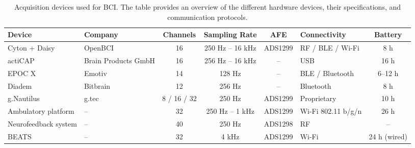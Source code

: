 \begin{table}[htbp]
    \renewcommand{\arraystretch}{1.2}
    \renewcommand{\tabularxcolumn}[1]{m{#1}}
    \caption{Acquisition devices used for BCI. The table provides an overview of the different hardware devices, their specifications, and communication protocols.}
    \label{table:bci_hardware}
    \centering
    \tiny
    \begin{tabularx}{\textwidth}{@{}
        >{\raggedright\arraybackslash}X
        >{\raggedright\arraybackslash}m{1.6cm}
        c
        c
        c
        >{\raggedright\arraybackslash}m{1.8cm}
        c @{}}
        \toprule
        \textbf{Device}                              & \textbf{Company}    & \textbf{Channels} & \textbf{Sampling Rate} & \textbf{AFE} & \textbf{Connectivity} & \textbf{Battery} \\ \midrule
        Cyton + Daisy \cite{OpenBCI_CytonDaisy}      & OpenBCI             & 16                & 250 Hz -- 16 kHz       & ADS1299      & RF / BLE / Wi-Fi      & 8 h              \\
        actiCAP \cite{BrainProducts_ActiCap}         & Brain Products GmbH & 16                & 256 Hz -- 16 kHz       & --           & USB                   & 16 h             \\
        EPOC X \cite{Emotiv_EPOCX}                   & Emotiv              & 14                & 128 Hz                 & --           & BLE / Bluetooth       & 6--12 h          \\
        Diadem \cite{Bitbrain_Diadem}                & Bitbrain            & 12                & 256 Hz                 & --           & Bluetooth             & 8 h              \\
        g.Nautilus \cite{Gtec_GNautilusProFlexible}  & g.tec               & 8 / 16 / 32       & 250 Hz                 & ADS1299      & Proprietary           & 10 h             \\
        Ambulatory platform \cite{pinho2014wireless} & --                  & 32                & 250 Hz -- 1 kHz        & ADS1299      & Wi-Fi 802.11 b/g/n    & 26 h             \\
        Neurofeedback system \cite{Totev2023}        & --                  & 40                & 250 Hz                 & ADS1298      & RF                    & --               \\
        BEATS \cite{Beats}                           & --                  & 32                & 4 kHz                  & ADS1299      & Wi-Fi                 & 24 h (wired)     \\ \bottomrule
    \end{tabularx}
\end{table}

